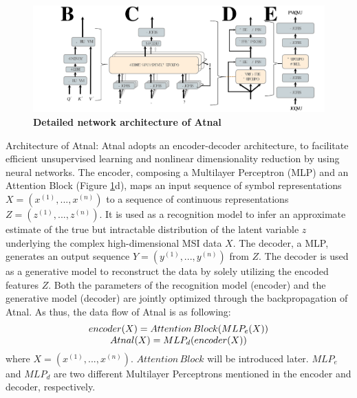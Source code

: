 \documentclass{WileyMSP-template}
\begin{document}
\begin{figure}[htbp]
  \centering
    \includegraphics[width=\textwidth]{pic/attention.pdf}
\caption{\textbf{Detailed network architecture of Atnal}}
\label{fig:Atnal}
\end{figure}
Architecture of Atnal: Atnal adopts an encoder-decoder architecture, 
to facilitate efficient unsupervised learning and nonlinear 
dimensionality reduction by using neural networks.  
The encoder, composing a Multilayer Perceptron (MLP) and an Attention Block  
\cite{vaswani2017attention} 
(Figure \ref{fig:Atnal}d), 
maps an input sequence of symbol representations $X=( x^{(1)},...,x^{(n)})$ 
to a sequence of continuous representations $Z=(z^{(1)},...,z^{(n)})$. 
It is used as a recognition model to 
infer an approximate estimate of the true but intractable distribution of the latent 
variable $z$ underlying the complex high-dimensional MSI data $X$. 
The decoder, a MLP, generates an output sequence $ Y=(y^{(1)},...,y^{(n)}) $
from $Z$. 
The decoder is used as a generative model to reconstruct the data by solely 
utilizing the encoded features $Z$. Both the parameters 
of the recognition model (encoder) and the generative model (decoder)
are jointly optimized through the backpropagation of Atnal. As thus, the data flow of 
Atnal is as following: 
\begin{equation} 
  \begin{minipage}[c]{0.80\linewidth}
    \centering
    $encoder(X) = Attention \, Block(MLP_e(X))$ \\
    $Atnal(X)=MLP_d(encoder(X))$ \\
  \end{minipage}
  \label{eqn:Atnal}
\end{equation}
where $X=( x^{(1)}, ..., x^{(n)})$. $Attention \, Block$ will be introduced later. $MLP_e$ and $MLP_d$ are two different 
Multilayer Perceptrons mentioned in the encoder and decoder, respectively.
\end{document}
